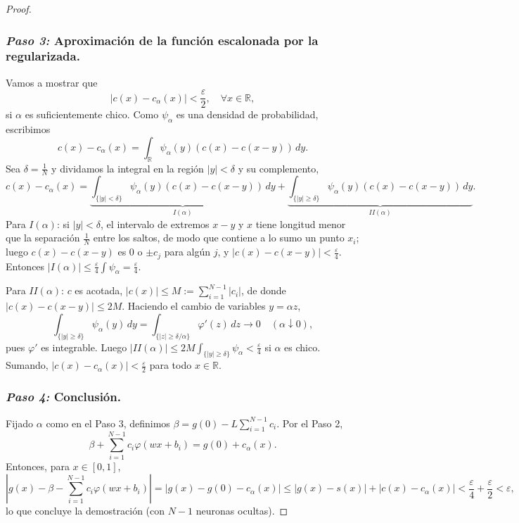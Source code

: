 \documentclass[12pt, a4paper]{amsbook}
\newcommand{\ve}{\varepsilon}
\newcommand{\R}{{\mathbb R}}
\theoremstyle{remark}
\theoremstyle{definition}
\numberwithin{section}{chapter}
\numberwithin{subsection}{section}
\numberwithin{equation}{section}
\numberwithin{figure}{chapter}
\begin{document}
\begin{proof}
\subsubsection*{{\em Paso 3:} Aproximación de la función escalonada por la regularizada.}
Vamos a mostrar que 
$$
|c(x) - c_\alpha(x)| < \frac{\ve}{2},\quad \forall x\in \R,
$$
si $\alpha$ es suficientemente chico. Como $\psi_\alpha$ es una densidad de probabilidad, escribimos
$$
c(x)-c_\alpha(x) = \int_\R \psi_\alpha(y) (c(x)-c(x-y))\, dy.
$$
Sea $\delta=\frac1N$ y dividamos la integral en la región $|y|<\delta$ y su complemento,
$$
c(x)-c_\alpha(x) = \underbrace{\int_{\{|y|<\delta\}}\psi_\alpha(y) (c(x)-c(x-y))\, dy}_{I(\alpha)} + \underbrace{\int_{\{|y|\ge\delta\}}\psi_\alpha(y) (c(x)-c(x-y))\, dy}_{II(\alpha)}.
$$
Para $I(\alpha)$: si $|y|<\delta$, el intervalo de extremos $x-y$ y $x$ tiene longitud menor que la separación $\frac1N$ entre los saltos, de modo que contiene a lo sumo un punto $x_i$; luego $c(x)-c(x-y)$ es $0$ o $\pm c_j$ para algún $j$, y $|c(x)-c(x-y)|<\frac\ve4$. Entonces $|I(\alpha)|\le\frac\ve4\int\psi_\alpha=\frac{\ve}4$.

Para $II(\alpha)$: $c$ es acotada, $|c(x)|\le M:=\sum_{i=1}^{N-1}|c_i|$, de donde $|c(x)-c(x-y)|\le 2M$. Haciendo el cambio de variables $y=\alpha z$,
$$
\int_{\{|y|\ge\delta\}}\psi_\alpha(y)\,dy=\int_{\{|z|\ge\delta/\alpha\}}\varphi'(z)\,dz\longrightarrow0\quad(\alpha\downarrow0),
$$
pues $\varphi'$ es integrable. Luego $|II(\alpha)|\le 2M\int_{\{|y|\ge\delta\}}\psi_\alpha<\frac\ve4$ si $\alpha$ es chico. Sumando, $|c(x)-c_\alpha(x)|<\frac\ve2$ para todo $x\in\R$.

\subsubsection*{{\em Paso 4:} Conclusión.}

Fijado $\alpha$ como en el Paso 3, definimos $\beta=g(0)-L\sum_{i=1}^{N-1}c_i$. Por el Paso 2,
$$
\beta+\sum_{i=1}^{N-1}c_i\varphi(wx+b_i)=g(0)+c_\alpha(x).
$$
Entonces, para $x\in[0,1]$,
$$
\left|g(x)-\beta-\sum_{i=1}^{N-1}c_i\varphi(wx+b_i)\right|=|g(x)-g(0)-c_\alpha(x)|\le |g(x)-s(x)|+|c(x)-c_\alpha(x)|<\frac\ve4+\frac\ve2<\ve,
$$
lo que concluye la demostración (con $N-1$ neuronas ocultas).
\end{proof}
\end{document}
